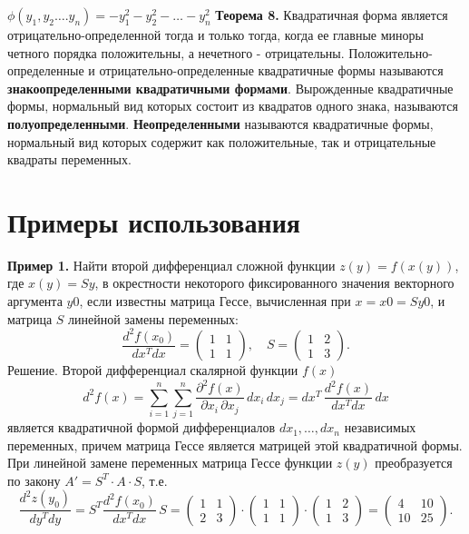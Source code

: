 \documentclass[bachelor, och, coursework, times]{SCWorks}
\newcommand\tab[1][1cm]{\hspace*{#1}}
\newcommand{\tl}{\newline\tab}
\begin{document}
$\phi(y_1,y_2….y_n)= -y_{1}^2-y_{2}^2 -…- y_{n}^2$
\tl
\textbf{Теорема 8.} Квадратичная форма является отрицательно-определенной тогда и только тогда, когда ее главные миноры четного порядка положительны, а нечетного - отрицательны.
\tl
Положительно-определенные и отрицательно-определенные квадратичные формы называются \textbf{знакоопределенными квадратичными формами}.
\tl
Вырожденные квадратичные формы, нормальный вид которых состоит из квадратов одного знака, называются \textbf{полуопределенными}. \textbf{Неопределенными} называются квадратичные формы, нормальный вид которых содержит как положительные, так и отрицательные квадраты переменных.

\section{Примеры использования}
\tab \textbf{Пример 1.} Найти второй дифференциал сложной функции $z(y)=f(x(y))$, где $x(y)=Sy$, в окрестности некоторого фиксированного значения векторного аргумента $y0$, если известны матрица Гессе, вычисленная при $x=x0=Sy0$, и матрица $S$
линейной замены переменных:
$$\frac{d^2f(x_0)}{dx^Tdx}
=\begin{pmatrix}
1&1\\
1&1
\end{pmatrix}\!,\quad 
S=
\begin{pmatrix}
1&2\\
1&3
\end{pmatrix}\!.$$
Решение. Второй дифференциал скалярной функции $f(x)$
$$d^2f(x)=\sum_{i=1}^{n}\sum_{j=1}^{n}\frac{\partial^2f(x)}{\partial x_i\,\partial x_j}\,dx_i\,dx_j= dx^T\,\frac{d^2f(x)}{dx^Tdx}\,dx$$
является квадратичной формой дифференциалов $dx_1,…,dx_n$
независимых переменных, причем матрица Гессе является матрицей этой квадратичной формы. При линейной замене переменных матрица Гессе функции $z(y)$ преобразуется по закону $A'=S^T\cdot A\cdot S$, т.е.
$$\frac{d^2z(y_0)}{dy^Tdy}= S^T\frac{d^2f(x_0)}{dx^Tdx}\,S= \begin{pmatrix}
1&1\\
2&3
\end{pmatrix}\!\cdot\! 
\begin{pmatrix}
1&1\\
1&1
\end{pmatrix}\!\cdot\! 
\begin{pmatrix} 
1&2\\
1&3
\end{pmatrix} = 
\begin{pmatrix} 
4&10\\
10&25
\end{pmatrix}\!.$$
\end{document}
